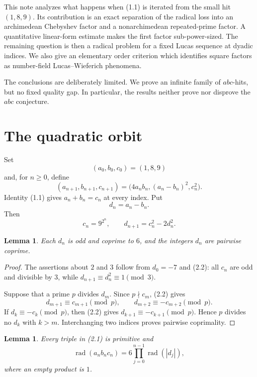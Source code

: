 \documentclass[11pt]{article}
\newtheorem{lemma}[theorem]{Lemma}
\theoremstyle{remark}
\newcommand{\rad}{\operatorname{rad}}
\begin{document}
This note analyzes what happens when (1.1) is iterated from the small hit
\((1,8,9)\).  Its contribution is an exact separation of the radical loss
into an archimedean Chebyshev factor and a nonarchimedean repeated-prime
factor.  A quantitative linear-form estimate makes the first factor
sub-power-sized.  The remaining question is then a radical problem for a
fixed Lucas sequence at dyadic indices.  We also give an elementary order
criterion which identifies square factors as number-field
Lucas--Wieferich phenomena.

The conclusions are deliberately limited.  We prove an infinite family of
\(abc\)-hits, but no fixed quality gap.  In particular, the results neither
prove nor disprove the \(abc\) conjecture.

\section{The quadratic orbit}

Set
\[
 (a_0,b_0,c_0)=(1,8,9)
\]
and, for \(n\geq0\), define
\[
 (a_{n+1},b_{n+1},c_{n+1})
   =\bigl(4a_nb_n,(a_n-b_n)^2,c_n^2\bigr).                 \tag{2.1}
\]
Identity (1.1) gives \(a_n+b_n=c_n\) at every index.  Put
\[
 d_n=a_n-b_n.
\]
Then
\[
 c_n=9^{2^n},\qquad
 d_{n+1}=c_n^2-2d_n^2.                                    \tag{2.2}
\]

\begin{lemma}\label{lem:coprime}
Each \(d_n\) is odd and coprime to \(6\), and the integers \(d_n\) are
pairwise coprime.
\end{lemma}

\begin{proof}
The assertions about \(2\) and \(3\) follow from \(d_0=-7\) and (2.2):
all \(c_n\) are odd and divisible by \(3\), while
\(d_{n+1}\equiv d_n^2\equiv1\pmod3\).

Suppose that a prime \(p\) divides \(d_m\).  Since \(p\nmid c_m\), (2.2)
gives
\[
 d_{m+1}\equiv c_{m+1}\pmod p,\qquad
 d_{m+2}\equiv-c_{m+2}\pmod p.
\]
If \(d_k\equiv-c_k\pmod p\), then (2.2) gives
\(d_{k+1}\equiv-c_{k+1}\pmod p\).  Hence \(p\) divides no \(d_k\) with
\(k>m\).  Interchanging two indices proves pairwise coprimality.
\end{proof}

\begin{lemma}\label{lem:support}
Every triple in (2.1) is primitive and
\[
 \rad(a_nb_nc_n)=6\prod_{j=0}^{n-1}\rad(|d_j|),            \tag{2.3}
\]
where an empty product is \(1\).
\end{lemma}
\end{document}
